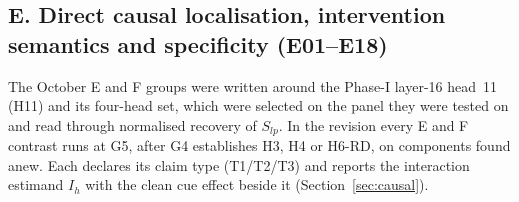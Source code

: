 \documentclass[10pt,a4paper]{article}
\begin{document}
\subsection{E. Direct causal localisation, intervention semantics and specificity (E01--E18)}
\label{sec:inv-E}

The October E and F groups were written around the Phase-I layer-16 head~11 (H11) and its four-head set, which
were selected on the panel they were tested on and read through normalised recovery of $S_{lp}$. In the revision
every E and F contrast runs at G5, after G4 establishes H3, H4 or H6-RD, on components found anew. Each declares its claim type
(T1/T2/T3) and reports the interaction estimand $I_h$ with the clean cue effect beside it
(Section~\ref{sec:causal}).
\end{document}

